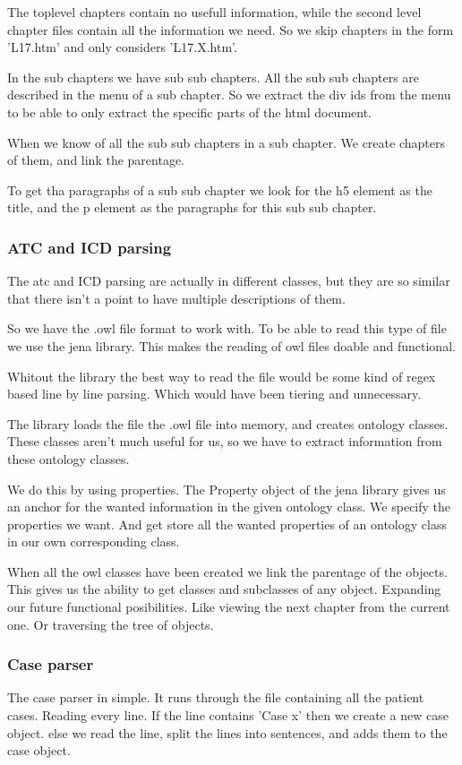 \documentclass[12pt, a4paper]{article}
\begin{document}
The toplevel chapters contain no usefull information, while the second level chapter files
contain all the information we need. So we skip chapters in the form 'L17.htm'
and only considers 'L17.X.htm'. 

In the sub chapters we have sub sub chapters. All the sub sub chapters are described
in the menu of a sub chapter. So we extract the div ids from the menu to be
able to only extract the specific parts of the html document. 

When we know of all the sub sub chapters in a sub chapter. We create chapters of
them, and link the parentage. 

To get tha paragraphs of a sub sub chapter we look for the h5 element as the
title, and the p element as the paragraphs for this sub sub chapter. 

\subsubsection{ATC and ICD parsing}
The atc and ICD parsing are actually in different classes, but they are so
similar that there isn't a point to have multiple descriptions of them. 

So we have the .owl file format to work with. To be able to read this type of
file we use the jena library. This makes the reading of owl files doable and
functional. 

Whitout the library the best way to read the file would be some
kind of regex based line by line parsing. Which would have been tiering and
unnecessary. 

The library loads the file the .owl file into memory, and creates ontology
classes. These classes aren't much useful for us, so we have to extract
information from these ontology classes.

We do this by using properties. The Property object of the jena library gives
us an anchor for the wanted information in the given ontology class. We specify
the properties we want. And get store all the wanted properties of an ontology
class in our own corresponding class. 

When all the owl classes have been created we link the parentage of the
objects. This gives us the ability to get classes and subclasses of any object.
Expanding our future functional posibilities. Like viewing the next chapter
from the current one. Or traversing the tree of objects. 

\subsubsection{Case parser}
The case parser in simple. It runs through the file containing all the patient
cases. Reading every line. If the line contains 'Case x' then we create a new
case object. else we read the line, split the lines into sentences, and adds
them to the case object. 
\end{document}
